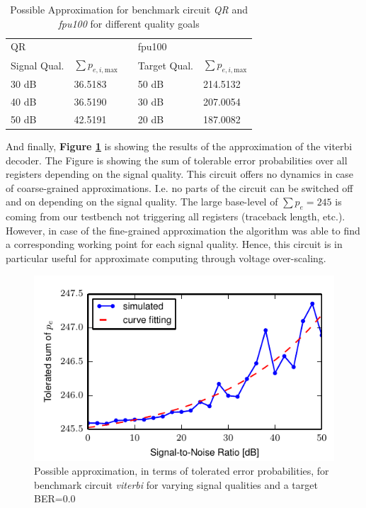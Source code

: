 \documentclass[10pt,twocolumn]{IEEEtran} %
\begin{document}
\begin{table}[htb]
\caption{Possible Approximation for benchmark circuit \emph{QR} and \emph{fpu100} for different quality goals}
\label{tab:approx}
\centering
\begin{tabular} { l  l  l  l  l }
\multicolumn{2}{l}{QR} & & \multicolumn{2}{l}{fpu100} \\
\cline{1-2} \cline{4-5}
Signal Qual.& $\sum p_{e,i,\textrm{max}}$ & & Target Qual.& $\sum p_{e,i,\textrm{max}}$\\
\cline{1-2} \cline{4-5}
30 dB & 36.5183 & &50 dB & 214.5132 \\
40 dB & 36.5190 & &30 dB & 207.0054 \\
50 dB & 42.5191 & &20 dB & 187.0082 \\

\hline



\end{tabular}
\end{table}

And finally, {\bf Figure \ref{fig:power_viterbi}} is showing the results of the approximation of the viterbi decoder. The Figure is showing the sum of tolerable error probabilities over all registers depending on the signal quality. This circuit offers no dynamics in case of coarse-grained approximations. I.e. no parts of the circuit can be switched off and on depending on the signal quality. The large base-level of $\sum p_e = 245$ is coming from our testbench not triggering all registers (traceback length, etc.). However, in case of the fine-grained approximation the algorithm was able to find a corresponding working point for each signal quality. Hence, this circuit is in particular useful for approximate computing through voltage over-scaling.
\begin{figure}[htb]
  \centering
  \includegraphics[width=.48\textwidth]{figs/optimization_viterbi}
  \caption{Possible approximation, in terms of tolerated error probabilities, for benchmark circuit \emph{viterbi} for varying signal qualities and a target BER=$0.0$}
  \label{fig:power_viterbi}
\end{figure}
\end{document}
